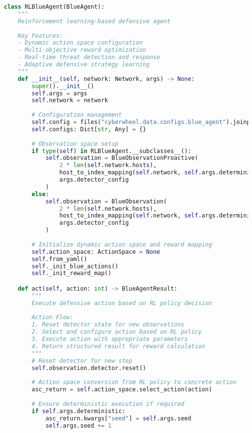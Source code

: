 \documentclass[12pt,a4paper]{article}
\begin{document}
\begin{lstlisting}[language=Python, caption=RL Blue Agent Implementation]
class RLBlueAgent(BlueAgent):
    """
    Reinforcement learning-based defensive agent
    
    Key Features:
    - Dynamic action space configuration
    - Multi-objective reward optimization
    - Real-time threat detection and response
    - Adaptive defensive strategy learning
    """
    def __init__(self, network: Network, args) -> None:
        super().__init__()
        self.args = args
        self.network = network
        
        # Configuration management
        self.config = files("cyberwheel.data.configs.blue_agent").joinpath(args.blue_agent)
        self.configs: Dict[str, Any] = {}
        
        # Observation space setup
        if type(self) in RLBlueAgent.__subclasses__():
            self.observation = BlueObservationProactive(
                2 * len(self.network.hosts), 
                host_to_index_mapping(self.network, self.args.deterministic), 
                args.detector_config
            )
        else:
            self.observation = BlueObservation(
                2 * len(self.network.hosts), 
                host_to_index_mapping(self.network, self.args.deterministic), 
                args.detector_config
            )
        
        # Initialize dynamic action space and reward mapping
        self.action_space: ActionSpace = None
        self.from_yaml()
        self._init_blue_actions()
        self._init_reward_map()

    def act(self, action: int) -> BlueAgentResult:
        """
        Execute defensive action based on RL policy decision
        
        Action Flow:
        1. Reset detector state for new observations
        2. Select and configure action based on RL policy
        3. Execute action with appropriate parameters
        4. Return structured result for reward calculation
        """
        # Reset detector for new step
        self.observation.detector.reset()
        
        # Action space conversion from RL policy to concrete action
        asc_return = self.action_space.select_action(action)
        
        # Ensure deterministic execution if required
        if self.args.deterministic:
            asc_return.kwargs["seed"] = self.args.seed
            self.args.seed += 1
        

\end{lstlisting}
\end{document}
